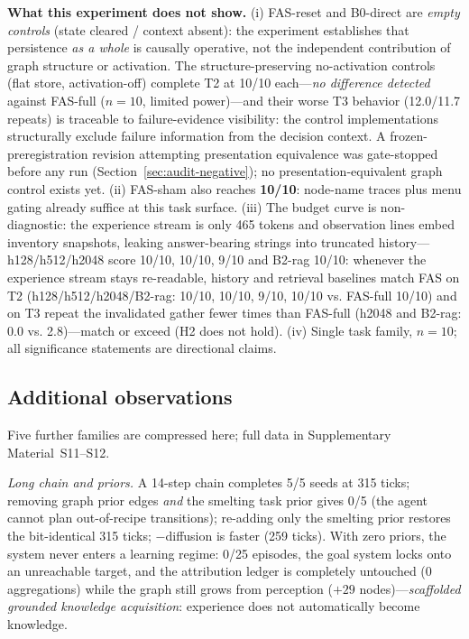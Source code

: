 \documentclass[10pt,a4paper]{article}
\begin{document}
\textbf{What this experiment does not show.} (i) FAS-reset and
B0-direct are \emph{empty controls} (state cleared / context absent):
the experiment establishes that persistence \emph{as a whole} is
causally operative, not the independent contribution of graph
structure or activation. The structure-preserving no-activation
controls (flat store, activation-off) complete T2 at 10/10
each---\emph{no difference detected} against FAS-full ($n{=}10$,
limited power)---and their worse T3 behavior (12.0/11.7 repeats) is
traceable to failure-evidence visibility: the control implementations
structurally exclude failure information from the decision context.
A frozen-preregistration revision attempting presentation equivalence
was gate-stopped before any run (Section~\ref{sec:audit-negative}); no
presentation-equivalent graph control exists yet. (ii) FAS-sham also reaches
\textbf{10/10}: node-name traces plus menu gating already suffice at
this task surface. (iii) The budget curve is non-diagnostic: the
experience stream is only 465 tokens and observation lines embed
inventory snapshots, leaking answer-bearing strings into truncated
history---h128/h512/h2048 score 10/10, 10/10, 9/10 and B2-rag 10/10:
whenever the experience stream stays re-readable, history and retrieval baselines match FAS on T2 (h128/h512/h2048/B2-rag: 10/10, 10/10, 9/10, 10/10 vs. FAS-full 10/10) and on T3 repeat the invalidated gather fewer times than FAS-full (h2048 and B2-rag: 0.0 vs. 2.8)---match or exceed (H2 does not hold). (iv) Single task
family, $n{=}10$; all significance statements are directional claims.

\subsection{Additional observations}
\label{sec:res-system}
Five further families are compressed here; full data in Supplementary Material~S11--S12.

\emph{Long chain and priors.} A 14-step chain completes 5/5 seeds at 315 ticks; removing graph prior edges \emph{and} the smelting task prior gives 0/5 (the agent cannot plan out-of-recipe transitions); re-adding only the smelting prior restores the bit-identical 315 ticks; $-$diffusion is faster (259 ticks). With zero priors, the system never enters a learning regime: 0/25 episodes, the goal system locks onto an unreachable target, and the attribution ledger is completely untouched (0 aggregations) while the graph still grows from perception ($+29$ nodes)---\emph{scaffolded grounded knowledge acquisition}: experience does not automatically become knowledge.
\end{document}
